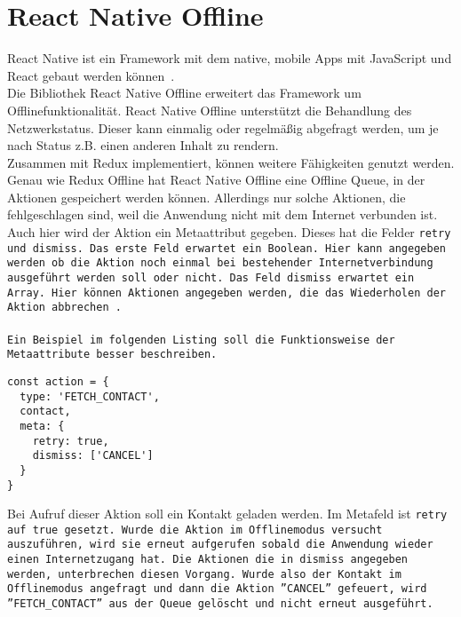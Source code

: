 \section{React Native Offline}
React Native ist ein Framework mit dem native, mobile Apps mit JavaScript und React gebaut werden können~\cite{rn}.\\
Die Bibliothek React Native Offline erweitert das Framework um Offlinefunktionalität.
React Native Offline unterstützt die Behandlung des Netzwerkstatus.
Dieser kann einmalig oder regelmäßig abgefragt werden, um je nach Status z.B. einen anderen Inhalt zu rendern.\\
Zusammen mit Redux implementiert, können weitere Fähigkeiten genutzt werden.
Genau wie Redux Offline hat React Native Offline eine Offline \gls{Queue}, in der Aktionen gespeichert werden können.
Allerdings nur solche Aktionen, die fehlgeschlagen sind, weil die Anwendung nicht mit dem Internet verbunden ist.
Auch hier wird der Aktion ein Metaattribut gegeben. Dieses hat die Felder \tt{retry} und \tt{dismiss}.
Das erste Feld erwartet ein Boolean. Hier kann angegeben werden ob die Aktion noch einmal bei bestehender Internetverbindung ausgeführt werden soll oder nicht.
Das Feld \tt{dismiss} erwartet ein Array. Hier können Aktionen angegeben werden, die das Wiederholen der Aktion abbrechen~\cite{rn-offline-gh}.\\\\
Ein Beispiel im folgenden Listing soll die Funktionsweise der Metaattribute besser beschreiben.
%
\begin{lstlisting}
const action = {
  type: 'FETCH_CONTACT',
  contact,
  meta: {
    retry: true,
    dismiss: ['CANCEL']
  }
}
\end{lstlisting}
%
Bei Aufruf dieser Aktion soll ein Kontakt geladen werden.
Im Metafeld ist \tt{retry} auf \tt{true} gesetzt.
Wurde die Aktion im Offlinemodus versucht auszuführen, wird sie erneut aufgerufen sobald die Anwendung wieder einen Internetzugang hat.
Die Aktionen die in \tt{dismiss} angegeben werden, unterbrechen diesen Vorgang.
Wurde also der Kontakt im Offlinemodus angefragt und dann die Aktion ''CANCEL'' gefeuert, wird ''FETCH\_CONTACT'' aus der Queue gelöscht und nicht erneut ausgeführt.
